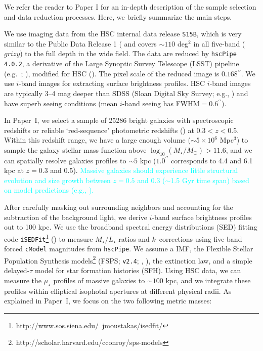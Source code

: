 \documentclass[a4paper,fleqn,usenatbib]{mnras}
\def\arcsec{{\prime\prime}}
\def\asec{$^{\prime\prime}$}
\def\cmodel{\texttt{cModel}}
\def\logms{{$\log_{10} (M_{\star}/M_{\odot})$}}
\def\m2l{{$M_{\star}/L_{\star}$}}
\def\mden{{$\mu_{\star}$}}
\newcommand{\song}[1]{\textcolor{cyan}{#1}}
\begin{document}
    We refer the reader to Paper I for an in-depth description of the sample selection 
    and data reduction processes. 
    Here, we briefly summarize the main steps.
    
    We use imaging data from the HSC internal data release 
    \texttt{S15B}, which is very similar to the Public Data Release 1 
    (\citealt{HSC-DR1} and covers ${\sim} 110$ deg$^2$ in all five-band ($grizy$) to 
    the full depth in the wide field. 
    The data are reduced by \texttt{hscPipe 4.0.2}, a derivative of the 
    Large Synoptic Survey Telescope (LSST) pipeline (e.g.\ \citealt{Juric2015}; 
    \citealt{Axelrod2010}), modified for HSC (\citealt{HSC-PIPE}).
    The pixel scale of the reduced image is $0.168$\asec{}.
    We use $i$-band images for extracting surface brightness profiles. 
    HSC $i$-band images are typically 3--4 mag deeper than SDSS 
    (Sloan Digital Sky Survey; e.g., \citealt{SDSS-DR7, SDSS-DR8, SDSS-DR12})  
    and have superb seeing conditions (mean $i$-band seeing has FWHM$=0.6$\asec{}).
    
    In Paper~I, we select a sample of 25286 bright galaxies with spectroscopic 
    redshifts or reliable `red-sequence' photometric redshifts (\citealt{Rykoff2014}) 
    at $0.3<z<0.5$. 
    Within this redshift range, we have a large enough volume 
    ($\sim5\times 10^6$ Mpc$^3$) to sample the galaxy stellar mass function above 
    \logms$>11.6$, and we can spatially resolve galaxies profiles to $\sim 5$ kpc 
    ($1.0^{\arcsec}$ corresponds to 4.4 and 6.1 kpc at $z=0.3$ and 0.5). 
    \song{
    Massive galaxies should experience little structural evolution and 
    size growth between $z=0.5$ and 0.3 ($\sim$1.5 Gyr time span) 
    based on model predictions (e.g., \citealt{Shankar2015}).
    }
    
    After carefully 
    masking out surrounding neighbors and accounting for the subtraction of the 
    background light, we derive $i$-band surface brightness profiles out to 100 kpc. 
    We use the broadband spectral energy distributions (SED) fitting code 
    \texttt{iSEDFit}\footnote{http://www.sos.siena.edu/~jmoustakas/isedfit/} 
    (\citealt{Moustakas13}) to measure \m2l{} ratios and $k$--corrections using 
    five-band forced \cmodel{} magnitudes from \texttt{hscPipe}. 
    We assume a \citet{Chabrier2003} IMF, the Flexible Stellar Population 
    Synthesis models\footnote{http://scholar.harvard.edu/cconroy/sps-models}
    (FSPS; \texttt{v2.4}; \citealt{FSPS}, \citealt{Conroy2010}), the 
    \citet{Calzetti2000} extinction law, and a simple delayed-$\tau$ model for 
    star formation histories (SFH). 
    Using HSC data, we can measure the \mden{} profiles of massive galaxies to 
    $\sim 100$ kpc, and we integrate these profiles within elliptical isophotal
    apertures at different physical radii. 
    As explained in Paper~I, we focus on the two following metric masses:
        
\end{document}

